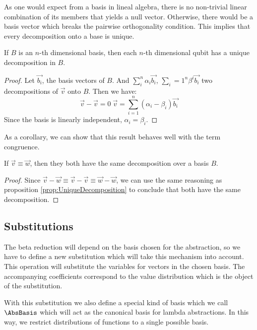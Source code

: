 As one would expect from a basis in lineal algebra, there is no non-trivial linear combination of its members that yields a null vector. Otherwise, there would be a basis vector which breaks the pairwise orthogonality condition. This implies that every decomposition onto a base is unique.

\begin{proposition}\label{prop:UniqueDecomposition}
  If $B$ is an $n$-th dimensional basis, then each $n$-th dimensional qubit has a unique decomposition in $B$.
\end{proposition}

\begin{proof}
  Let $\vec{b_i}$, the basis vectors of $B$. And $\sum_i^n\alpha_i \vec{b_i}$, $\sum_i=1^n \beta^i \vec{b_i}$ two decompositions of $\vec{v}$ onto $B$. Then we have:
  \[\vec{v} - \vec{v} = 0 \; \vec{v} = \sum_{i=1}^{n} (\alpha_i - \beta_i) \vec{b_i}\]
  Since the basis is linearly independent, $\alpha_i = \beta_i$.
\end{proof}

As a corollary, we can show that this result behaves well with the term congruence.

\begin{corollary}\label{cor:EquivalentDecomposition}
  If $\vec{v}\equiv\vec{w}$, then they both have the same decomposition over a basis $B$.
\end{corollary}
\begin{proof}
  Since $\vec{v} - \vec{w} \equiv \vec{v} - \vec{v} \equiv \vec{w} - \vec{w}$, we can use the same reasoning as proposition \ref{prop:UniqueDecomposition} to conclude that both have the same decomposition.
\end{proof}

\subsection{Substitutions}

The beta reduction will depend on the basis chosen for the abstraction, so we have to define a new substitution which will take this mechanism into account. This operation will substitute the variables for vectors in the chosen basis. The accompanying coefficients correspond to the value distribution which is the object of the substitution.
  
With this substitution we also define a special kind of basis which we call $\AbsBasis$ which will act as the canonical basis for lambda abstractions. In this way, we restrict distributions of functions to a single possible basis.


